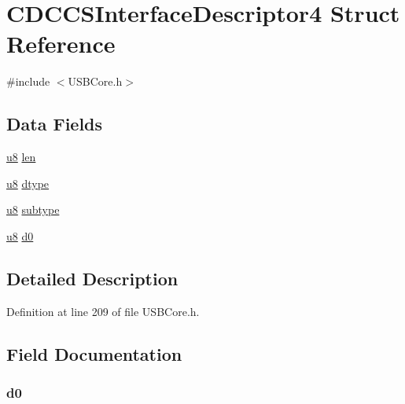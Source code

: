 \hypertarget{struct_c_d_c_c_s_interface_descriptor4}{}\section{C\+D\+C\+C\+S\+Interface\+Descriptor4 Struct Reference}
\label{struct_c_d_c_c_s_interface_descriptor4}


{\ttfamily \#include $<$U\+S\+B\+Core.\+h$>$}

\subsection*{Data Fields}
\begin{DoxyCompactItemize}
\item 
\hyperlink{_u_s_b_a_p_i_8h_aed742c436da53c1080638ce6ef7d13de}{u8} \hyperlink{struct_c_d_c_c_s_interface_descriptor4_afbf3f3230446569534d5f466aaf4c23b}{len}
\item 
\hyperlink{_u_s_b_a_p_i_8h_aed742c436da53c1080638ce6ef7d13de}{u8} \hyperlink{struct_c_d_c_c_s_interface_descriptor4_a0bb419531ec75697e63e9109fecf81b0}{dtype}
\item 
\hyperlink{_u_s_b_a_p_i_8h_aed742c436da53c1080638ce6ef7d13de}{u8} \hyperlink{struct_c_d_c_c_s_interface_descriptor4_afb82dd1313bc5284e4e5aef8218ef414}{subtype}
\item 
\hyperlink{_u_s_b_a_p_i_8h_aed742c436da53c1080638ce6ef7d13de}{u8} \hyperlink{struct_c_d_c_c_s_interface_descriptor4_a3e359aaf0f33f4eeedb3f26e73ac1cc7}{d0}
\end{DoxyCompactItemize}


\subsection{Detailed Description}


Definition at line 209 of file U\+S\+B\+Core.\+h.



\subsection{Field Documentation}
\hypertarget{struct_c_d_c_c_s_interface_descriptor4_a3e359aaf0f33f4eeedb3f26e73ac1cc7}{}
\subsubsection[{d0}]{ d0}\label{struct_c_d_c_c_s_interface_descriptor4_a3e359aaf0f33f4eeedb3f26e73ac1cc7}


